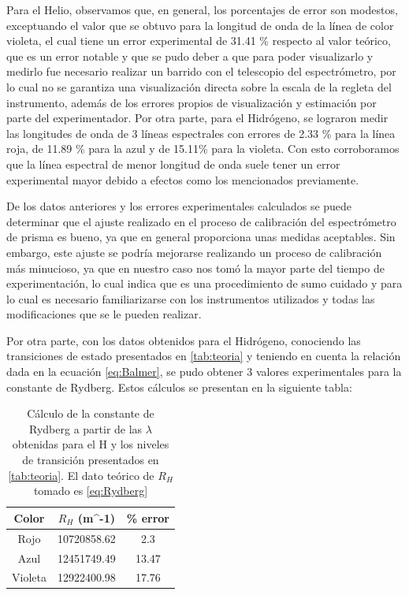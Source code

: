 \documentclass[%
 reprint,
 amsmath,amssymb,
 aps,
]{revtex4-1}
\begin{document}
Para el Helio, observamos que, en general, los porcentajes de error son modestos, exceptuando el valor que se obtuvo para la longitud de onda de la línea de color violeta, el cual tiene un error experimental de 31.41 \% respecto al valor teórico, que es un error notable y que se pudo deber a que para poder visualizarlo y medirlo fue necesario realizar un barrido con el telescopio del espectrómetro, por lo cual no se garantiza una visualización directa sobre la escala de la regleta del instrumento, además de los errores propios de visualización y estimación por parte del experimentador. Por otra parte, para el Hidrógeno, se lograron medir las longitudes de onda de 3 líneas espectrales con errores de 2.33 \% para la línea roja, de 11.89 \% para la azul y de 15.11\% para la violeta. Con esto corroboramos que la línea espectral de menor longitud de onda suele tener un error experimental mayor debido a efectos como los mencionados previamente.

De los datos anteriores y los errores experimentales calculados se puede determinar que el ajuste realizado en el proceso de calibración del espectrómetro de prisma es bueno, ya que en general proporciona unas medidas aceptables. Sin embargo, este ajuste se podría mejorarse realizando un proceso de calibración más minucioso, ya que en nuestro caso nos tomó la mayor parte del tiempo de experimentación, lo cual indica que es una procedimiento de sumo cuidado y para lo cual es necesario familiarizarse con los instrumentos utilizados y todas las modificaciones que se le pueden realizar.

Por otra parte, con los datos obtenidos para el Hidrógeno, conociendo las transiciones de estado presentados en \ref{tab:teoria}  y teniendo en cuenta la relación dada en la ecuación \ref{eq:Balmer}, se pudo obtener 3 valores experimentales para la constante de Rydberg. Estos cálculos se presentan en la siguiente tabla:

\begin{table}[H]
    \centering
    \begin{tabular}{|c|c|c|}
    \hline
    Color & $R_{H}$ (m^{-1}) & \% error \\ \hline
    Rojo  & 10720858.62 & 2.3 \\ \hline
    Azul & 12451749.49 & 13.47\\ \hline
    Violeta  & 12922400.98  & 17.76 \\ \hline
    \end{tabular}
    \caption{Cálculo de la constante de Rydberg a partir de las $\lambda$ obtenidas para el H y los niveles de transición presentados en \ref{tab:teoria}. El dato teórico de $R_H$ tomado es \ref{eq:Rydberg} } 
    \label{tab:ryd}
\end{table}
\end{document}
